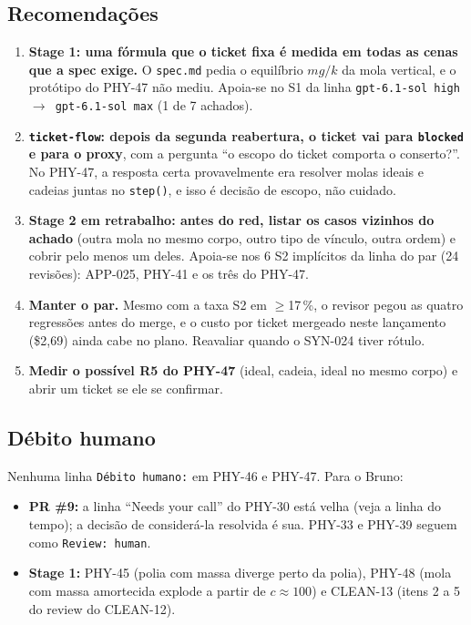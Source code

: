 \documentclass[11pt,a4paper]{article}
\begin{document}
\subsection{Recomendações}
\begin{enumerate}[start=9]
  \item \textbf{Stage 1: uma fórmula que o ticket fixa é medida em todas as
        cenas que a spec exige.} O \texttt{spec.md} pedia o equilíbrio
        $mg/k$ da mola vertical, e o protótipo do PHY-47 não mediu. Apoia-se
        no S1 da linha \texttt{gpt-6.1-sol high $\to$ gpt-6.1-sol max} (1 de
        7 achados).
  \item \textbf{\texttt{ticket-flow}: depois da segunda reabertura, o ticket
        vai para \texttt{blocked} e para o proxy}, com a pergunta ``o
        escopo do ticket comporta o conserto?''. No PHY-47, a resposta certa
        provavelmente era resolver molas ideais e cadeias juntas no
        \texttt{step()}, e isso é decisão de escopo, não cuidado.
  \item \textbf{Stage 2 em retrabalho: antes do red, listar os casos vizinhos
        do achado} (outra mola no mesmo corpo, outro tipo de vínculo, outra
        ordem) e cobrir pelo menos um deles. Apoia-se nos 6 S2 implícitos da
        linha do par (24 revisões): APP-025, PHY-41 e os três do PHY-47.
  \item \textbf{Manter o par.} Mesmo com a taxa S2 em $\geq$17\,\%, o revisor
        pegou as quatro regressões antes do merge, e o custo por ticket
        mergeado neste lançamento (\$2,69) ainda cabe no plano. Reavaliar
        quando o SYN-024 tiver rótulo.
  \item \textbf{Medir o possível R5 do PHY-47} (ideal, cadeia, ideal no mesmo
        corpo) e abrir um ticket se ele se confirmar.
\end{enumerate}

\subsection{Débito humano}

Nenhuma linha \texttt{Débito humano:} em PHY-46 e PHY-47. Para o Bruno:
\begin{itemize}
  \item \textbf{PR \#9:} a linha ``Needs your call'' do PHY-30 está velha (veja
        a linha do tempo); a decisão de considerá-la resolvida é sua. PHY-33 e
        PHY-39 seguem como \texttt{Review: human}.
  \item \textbf{Stage 1:} PHY-45 (polia com massa diverge perto da polia),
        PHY-48 (mola com massa amortecida explode a partir de $c \approx
        100$) e CLEAN-13 (itens 2 a 5 do review do CLEAN-12).
\end{itemize}
\end{document}
